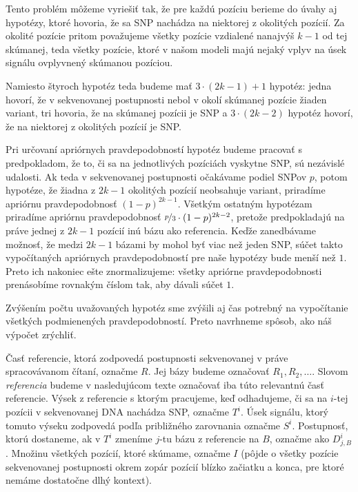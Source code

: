 Tento problém môžeme vyriešiť tak, že pre každú pozíciu berieme do úvahy aj hypotézy, ktoré hovoria, že 
sa SNP nachádza na niektorej z okolitých pozícií. Za okolité pozície pritom považujeme všetky pozície
vzdialené nanajvýš $k-1$ od tej skúmanej, teda všetky pozície, ktoré v našom modeli majú nejaký vplyv
na úsek signálu ovplyvnený skúmanou pozíciou.


Namiesto štyroch hypotéz teda budeme mať $3 \cdot (2k-1) + 1$ hypotéz: jedna hovorí, že v sekvenovanej 
postupnosti nebol v okolí skúmanej pozície žiaden variant, tri hovoria, že na skúmanej pozícii je SNP a
$3 \cdot (2k-2)$ hypotéz hovorí, že na niektorej z okolitých pozícií je SNP.

Pri určovaní apriórnych pravdepodobností hypotéz budeme pracovať s predpokladom, že to, či sa na 
jednotlivých
pozíciách vyskytne SNP, sú nezávislé udalosti.
Ak teda v sekvenovanej postupnosti očakávame podiel SNPov $p$, potom hypotéze, že žiadna z $2k-1$ okolitých 
pozícií neobsahuje variant, priradíme apriórnu pravdepodobnosť $(1-p)^{2k-1}$. Všetkým ostatným 
hypotézam 
priradíme apriórnu pravdepodobnosť $\nicefrac{p}{3} \cdot (1-p)^{2k-2}$, pretože predpokladajú na
práve jednej z $2k-1$ pozícií inú bázu ako referencia. Keďže zanedbávame možnosť, že medzi $2k-1$
bázami by mohol byť viac než jeden SNP, súčet takto vypočítaných apriórnych pravdepodobností pre
naše hypotézy bude menší než $1$. Preto ich nakoniec ešte znormalizujeme: všetky apriórne 
pravdepodobnosti prenásobíme rovnakým číslom tak, aby dávali súčet $1$.


Zvýšením počtu uvažovaných hypotéz sme zvýšili aj čas potrebný na vypočítanie všetkých
podmienených pravdepodobností. Preto navrhneme spôsob, ako náš výpočet zrýchliť.

Časť referencie, ktorá zodpovedá postupnosti sekvenovanej v práve spracovávanom čítaní, označme
$R$. Jej bázy budeme označovať $R_1, R_2, \dots$. Slovom \emph{referencia} budeme v nasledujúcom
texte označovať iba túto relevantnú časť referencie.
Výsek z referencie s ktorým pracujeme, keď odhadujeme, či sa na $i$-tej pozícii v sekvenovanej
DNA nachádza SNP, označme $T^i$. Úsek signálu, ktorý tomuto výseku zodpovedá podľa približného
zarovnania označme $S^i$. Postupnosť, ktorú dostaneme, ak v $T^i$ zmeníme $j$-tu bázu z referencie
na $B$, označme ako $D_{j,B}^i$. Množinu všetkých pozícií, ktoré skúmame, označme $I$ (pôjde o všetky
pozície sekvenovanej postupnosti okrem zopár pozícií blízko začiatku a konca, pre ktoré nemáme
dostatočne dlhý kontext).


